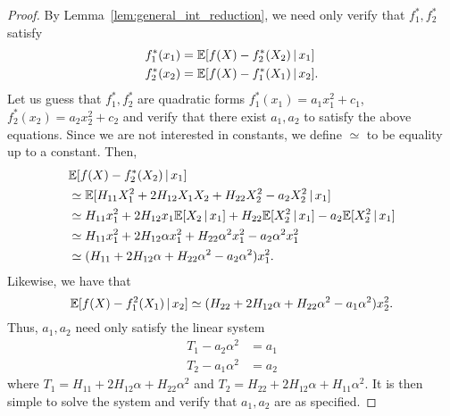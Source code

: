 \begin{proof}
By Lemma~\ref{lem:general_int_reduction}, we need only verify that $f^*_1, f^*_2$ satisfy
\begin{align*}
f^*_1(x_1) &= {\mathbb E}[ f(X) - f_2^*(X_2) {\,|\,} x_1] \\
f^*_2(x_2) &= {\mathbb E}[ f(X) - f_1^*(X_1) {\,|\,} x_2 ] .
\end{align*}
Let us guess that $f^*_1, f^*_2$ are quadratic forms $f^*_1(x_1) = a_1 x_1^2 + c_1$, $f^*_2(x_2) = a_2 x_2^2 + c_2$ and verify that there exist $a_1, a_2$ to satisfy the above equations. Since we are not interested in constants, we define $\simeq$ to be equality up to a constant. 
Then, 
\begin{align*}
&{\mathbb E}[ f(X) - f_2^*(X_2) {\,|\,} x_1]\\
& \simeq {\mathbb E}[ H_{11} X_1^2 + 2H_{12}X_1 X_2 + H_{22}X_2^2 - a_2 X_2^2 {\,|\,} x_1 ] \\ 
    &\simeq H_{11} x_1^2 + 2 H_{12} x_1 {\mathbb E}[X_2 {\,|\,} x_1] + H_{22} {\mathbb E}[X_2^2 {\,|\,} x_1] - a_2{\mathbb E}[X_2^2 {\,|\,} x_1] \\
   &\simeq H_{11} x_1^2 + 2H_{12} \alpha x_1^2 + H_{22} \alpha^2 x_1^2 - a_2 \alpha^2 x_1^2\\
   &\simeq (H_{11} + 2 H_{12} \alpha + H_{22} \alpha^2 - a_2 \alpha^2) x_1^2.
\end{align*}
Likewise, we have that
\[
{\mathbb E}[ f(X) - f_1^2(X_1) {\,|\,} x_2] \simeq (H_{22} + 2H_{12}\alpha + H_{22}\alpha^2 - a_1 \alpha^2) x_2^2.
\]
Thus, $a_1, a_2$ need only satisfy the linear system
\begin{align*}
T_1 - a_2 \alpha^2 &= a_1 \\
T_2 - a_1 \alpha^2 &= a_2 
\end{align*}
where $T_1 = H_{11} + 2H_{12} \alpha + H_{22} \alpha^2$ and $T_2 = H_{22} + 2H_{12} \alpha + H_{11} \alpha^2$.
It is then simple to solve the system and verify that $a_1, a_2$ are as specified.
\end{proof}




